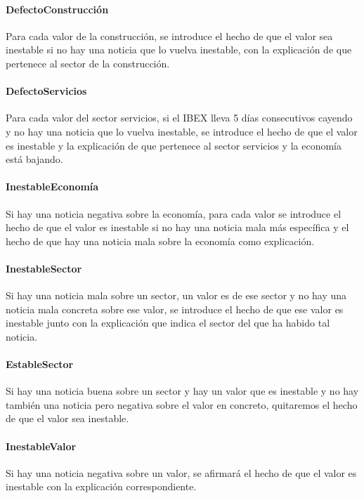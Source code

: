 \documentclass[11pt,leqno]{article}
\theoremstyle{definition_wo_parentheses}
\theoremstyle{plain}
\theoremstyle{remark}
\begin{document}
\paragraph{DefectoConstrucción} Para cada valor de la construcción, se introduce el hecho de que el valor sea inestable si no hay una noticia que lo vuelva inestable, con la explicación de que pertenece al sector de la construcción.

\paragraph{DefectoServicios} Para cada valor del sector servicios, si el IBEX lleva 5 días consecutivos cayendo y no hay una noticia que lo vuelva inestable, se introduce el hecho de que el valor es inestable y la explicación de que pertenece al sector servicios y la economía está bajando.

\paragraph{InestableEconomía} Si hay una noticia negativa sobre la economía, para cada valor se introduce el hecho de que el valor es inestable si no hay una noticia mala más específica y el hecho de que hay una noticia mala sobre la economía como explicación.

\paragraph{InestableSector} Si hay una noticia mala sobre un sector, un valor es de ese sector y no hay una noticia mala concreta sobre ese valor, se introduce el hecho de que ese valor es inestable junto con la explicación que indica el sector del que ha habido tal noticia.

\paragraph{EstableSector} Si hay una noticia buena sobre un sector y hay un valor que es inestable y no hay también una noticia pero negativa sobre el valor en concreto, quitaremos el hecho de que el valor sea inestable. 

\paragraph{InestableValor} Si hay una noticia negativa sobre un valor, se afirmará el hecho de que el valor es inestable con la explicación correspondiente.
\end{document}
